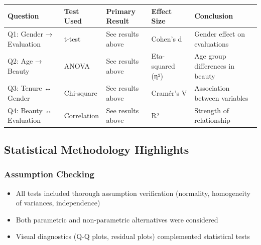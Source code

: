 \documentclass[11pt]{article}
\providecommand{\tightlist}{%
      \setlength{\itemsep}{0pt}\setlength{\parskip}{0pt}}
\begin{document}
\begin{longtable}[]{@{}
  >{\raggedright\arraybackslash}p{}
  >{\raggedright\arraybackslash}p{}
  >{\raggedright\arraybackslash}p{}
  >{\raggedright\arraybackslash}p{}
  >{\raggedright\arraybackslash}p{}@{}}
\toprule\noalign{}
\begin{minipage}[b]{\linewidth}\raggedright
Question
\end{minipage} & \begin{minipage}[b]{\linewidth}\raggedright
Test Used
\end{minipage} & \begin{minipage}[b]{\linewidth}\raggedright
Primary Result
\end{minipage} & \begin{minipage}[b]{\linewidth}\raggedright
Effect Size
\end{minipage} & \begin{minipage}[b]{\linewidth}\raggedright
Conclusion
\end{minipage} \\
\midrule\noalign{}
\endhead
\bottomrule\noalign{}
\endlastfoot
Q1: Gender → Evaluation & t-test & See results above & Cohen's d &
Gender effect on evaluations \\
Q2: Age → Beauty & ANOVA & See results above & Eta-squared (η²) & Age
group differences in beauty \\
Q3: Tenure ↔ Gender & Chi-square & See results above & Cramér's V &
Association between variables \\
Q4: Beauty ↔ Evaluation & Correlation & See results above & R² &
Strength of relationship \\
\end{longtable}

\subsection{Statistical Methodology
Highlights}\label{statistical-methodology-highlights}

\subsubsection{Assumption Checking}\label{assumption-checking}

\begin{itemize}
\tightlist
\item
  All tests included thorough assumption verification (normality,
  homogeneity of variances, independence)
\item
  Both parametric and non-parametric alternatives were considered
\item
  Visual diagnostics (Q-Q plots, residual plots) complemented
  statistical tests
\end{itemize}
\end{document}
